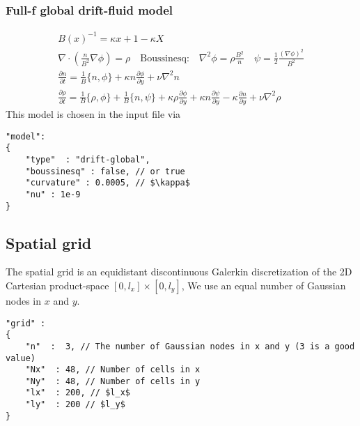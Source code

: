 \subsubsection{Full-f global drift-fluid model}
\begin{subequations}
\begin{align}
B(x)^{-1} = \kappa x +1-\kappa X\\
 \nabla \cdot \left(\frac{n}{B^2} \nabla \phi\right) = \rho \quad
 \text{Boussinesq:}\quad \nabla^2\phi = \rho \frac{B^2}{n} \quad
\psi = \frac{1}{2} \frac{(\nabla\phi)^2}{B^2}\\
 \frac{\partial n}{\partial t}     =
    \frac{1}{B}\{ n, \phi\}
  + \kappa n\frac{\partial \phi}{\partial y}
  + \nu \nabla^2 n  \\
  \frac{\partial \rho}{\partial t} =
  \frac{1}{B}\{ \rho, \phi\}
  + \frac{1}{B}\{n, \psi\}
  + \kappa \rho\frac{\partial \phi}{\partial y}
  + \kappa n\frac{\partial \psi}{\partial y}
  - \kappa\frac{\partial n}{\partial y} +\nu\nabla^2\rho 
\end{align}
\end{subequations}
This model is chosen in the input file via
\begin{verbatim}
"model":
{
    "type"  : "drift-global",
    "boussinesq" : false, // or true
    "curvature" : 0.0005, // $\kappa$
    "nu" : 1e-9
}
\end{verbatim}
\subsection{Spatial grid} \label{sec:spatial}
The spatial grid is an equidistant discontinuous Galerkin discretization of the
2D Cartesian product-space
$[ 0, l_x]\times [0, l_y]$,
We use an equal number of Gaussian nodes in $x$ and $y$.
\begin{verbatim}
"grid" :
{
    "n"  :  3, // The number of Gaussian nodes in x and y (3 is a good value)
    "Nx"  : 48, // Number of cells in x
    "Ny"  : 48, // Number of cells in y
    "lx"  : 200, // $l_x$
    "ly"  : 200 // $l_y$
}
\end{verbatim}



